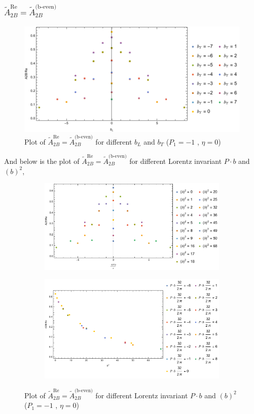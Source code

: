\documentclass[]{article}
\numberwithin{equation}{section}
\newcommand{\tAmp}{\widetilde{A}}
\newcommand{\tAmp}{\ensuremath{\widetilde{A}^{(+)}}}
\begin{document}
\subsubsection{$\tAmp^{\text{Re}}_{2B}=\tAmp^{\text{(b-even)}}_{2B}$}
\begin{figure}[h!]
    \centering
    \includegraphics[width=0.45\linewidth]{Amp_plots/bLbT_A2B_b_even_P1_-1_eta_0.pdf}
    \caption{Plot of  $\tAmp^{\text{Re}}_{2B}=\tAmp^{\text{(b-even)}}_{2B}$ for different $b_{L}$ and $b_{T}$  ($P_{1} = -1$ , $\eta=0$)}
\end{figure}

And below is the plot of $\tAmp^{\text{Re}}_{2B}=\tAmp^{\text{(b-even)}}_{2B}$ for different Lorentz invariant $P\cdot b$ and $(b)^2$,
\begin{figure}[h!]
     \centering
     \begin{subfigure}[b]{0.45\textwidth}
         \centering
         \includegraphics[width=\textwidth]{Amp_plots/bP_A2B_b_even_P1_-1_eta_0.pdf}
     \end{subfigure}
     \begin{subfigure}[b]{0.45\textwidth}
         \centering
         \includegraphics[width=\textwidth]{Amp_plots/bsq_A2B_b_even_P1_-1_eta_0.pdf}
     \end{subfigure}
        \caption{Plot of $\tAmp^{\text{Re}}_{2B}=\tAmp^{\text{(b-even)}}_{2B}$ for different Lorentz invariant $P\cdot b$ and $(b)^2$  ($P_{1} = -1$ , $\eta=0$)}
\end{figure}
\end{document}

